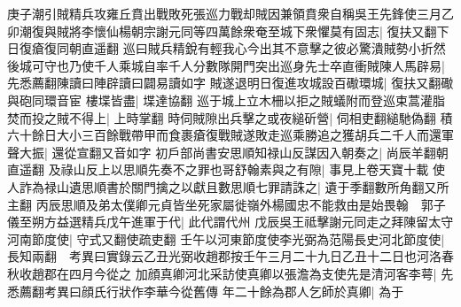 庚子潮引賊精兵攻雍丘賁出戰敗死張巡力戰却賊因兼領賁衆自稱吳王先鋒使三月乙卯潮復與賊將李懷仙楊朝宗謝元同等四萬餘衆奄至城下衆懼莫有固志|{
	復扶又翻下日復瘡復同朝直遥翻}
巡曰賊兵精銳有輕我心今出其不意擊之彼必驚潰賊勢小折然後城可守也乃使千人乘城自率千人分數隊開門突出巡身先士卒直衝賊陳人馬辟易|{
	先悉薦翻陳讀曰陣辟讀曰闢易讀如字}
賊遂退明日復進攻城設百礮環城|{
	復扶又翻礮與砲同環音宦}
樓堞皆盡|{
	堞達協翻}
巡于城上立木柵以拒之賊蟻附而登巡束蒿灌脂焚而投之賊不得上|{
	上時掌翻}
時伺賊隙出兵擊之或夜縋斫營|{
	伺相吏翻縋馳偽翻}
積六十餘日大小三百餘戰帶甲而食裹瘡復戰賊遂敗走巡乘勝追之獲胡兵二千人而還軍聲大振|{
	還從宣翻又音如字}
初戶部尚書安思順知禄山反謀因入朝奏之|{
	尚辰羊翻朝直遥翻}
及祿山反上以思順先奏不之罪也哥舒翰素與之有隙|{
	事見上卷天寶十載}
使人詐為禄山遺思順書於關門擒之以獻且數思順七罪請誅之|{
	遺于季翻數所角翻又所主翻}
丙辰思順及弟太僕卿元貞皆坐死家屬徙嶺外楊國忠不能救由是始畏翰　郭子儀至朔方益選精兵戊午進軍于代|{
	此代謂代州}
戊辰吳王祗擊謝元同走之拜陳留太守河南節度使|{
	守式又翻使疏吏翻}
壬午以河東節度使李光弼為范陽長史河北節度使|{
	長知兩翻　考異曰實錄云乙丑光弼收趙郡按壬午三月二十九日乙丑十二日也河洛春秋收趙郡在四月今從之}
加顔真卿河北采訪使真卿以張澹為支使先是清河客李萼|{
	先悉薦翻考異曰顔氏行狀作李華今從舊傳}
年二十餘為郡人乞師於真卿|{
	為于}


